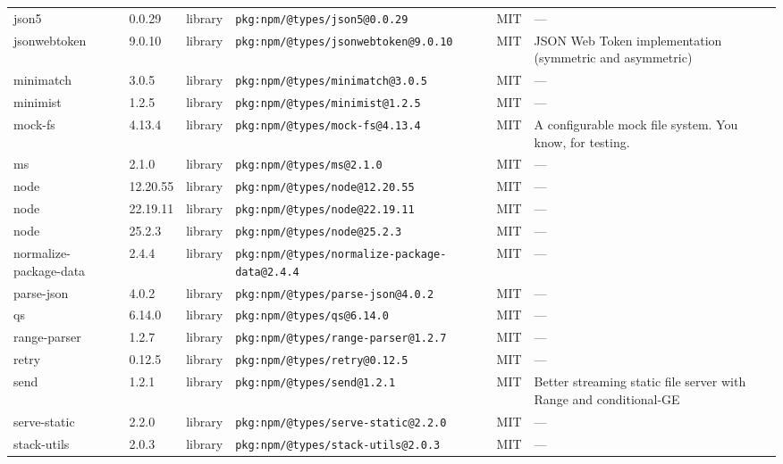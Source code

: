 \documentclass[11pt,a4paper]{article}
\begin{document}
\begin{longtable}{|p{4cm}|p{2cm}|p{1.6cm}|p{5cm}|p{1.5cm}|p{3.5cm}|}
\raggedright json5 & 0.0.29 & library & \small\texttt{pkg:npm/@types/json5@0.0.29} & MIT & \small — \\
\raggedright jsonwebtoken & 9.0.10 & library & \small\texttt{pkg:npm/@types/jsonwebtoken@9.0.10} & MIT & \small JSON Web Token implementation (symmetric and asymmetric) \\
\raggedright minimatch & 3.0.5 & library & \small\texttt{pkg:npm/@types/minimatch@3.0.5} & MIT & \small — \\
\raggedright minimist & 1.2.5 & library & \small\texttt{pkg:npm/@types/minimist@1.2.5} & MIT & \small — \\
\raggedright mock-fs & 4.13.4 & library & \small\texttt{pkg:npm/@types/mock-fs@4.13.4} & MIT & \small A configurable mock file system.  You know, for testing. \\
\raggedright ms & 2.1.0 & library & \small\texttt{pkg:npm/@types/ms@2.1.0} & MIT & \small — \\
\raggedright node & 12.20.55 & library & \small\texttt{pkg:npm/@types/node@12.20.55} & MIT & \small — \\
\raggedright node & 22.19.11 & library & \small\texttt{pkg:npm/@types/node@22.19.11} & MIT & \small — \\
\raggedright node & 25.2.3 & library & \small\texttt{pkg:npm/@types/node@25.2.3} & MIT & \small — \\
\raggedright normalize-package-data & 2.4.4 & library & \small\texttt{pkg:npm/@types/normalize-package-data@2.4.4} & MIT & \small — \\
\raggedright parse-json & 4.0.2 & library & \small\texttt{pkg:npm/@types/parse-json@4.0.2} & MIT & \small — \\
\raggedright qs & 6.14.0 & library & \small\texttt{pkg:npm/@types/qs@6.14.0} & MIT & \small — \\
\raggedright range-parser & 1.2.7 & library & \small\texttt{pkg:npm/@types/range-parser@1.2.7} & MIT & \small — \\
\raggedright retry & 0.12.5 & library & \small\texttt{pkg:npm/@types/retry@0.12.5} & MIT & \small — \\
\raggedright send & 1.2.1 & library & \small\texttt{pkg:npm/@types/send@1.2.1} & MIT & \small Better streaming static file server with Range and conditional-GE \\
\raggedright serve-static & 2.2.0 & library & \small\texttt{pkg:npm/@types/serve-static@2.2.0} & MIT & \small — \\
\raggedright stack-utils & 2.0.3 & library & \small\texttt{pkg:npm/@types/stack-utils@2.0.3} & MIT & \small — \\

\end{longtable}
\end{document}

